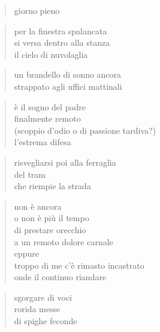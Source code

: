 \clearpage


\begin{verse}
    giorno pieno
\end{verse}

\begin{verse}
    per la finestra spalancata\\
    si versa dentro alla stanza\\
    il cielo di nuvolaglia
\end{verse}

\begin{verse}
    un brandello di sonno ancora\\
    strappato agli uffici mattinali
\end{verse}

\begin{verse}
    è il sogno del padre\\
    finalmente remoto\\
    (scoppio d’odio o di passione tardiva?)\\
    l’estrema difesa
\end{verse}

\begin{verse}
    risvegliarsi poi alla ferraglia\\
    del tram\\
    che riempie la strada
\end{verse}

\clearpage


\begin{verse}
    non è ancora\\
    o non è più il tempo\\
    di prestare orecchio\\
    a un remoto dolore carnale\\
    eppure\\
    troppo di me c'è rimasto incastrato\\
    onde il continuo riandare
\end{verse}

\clearpage


\begin{verse}
    sgorgare di voci\\
    rorida messe\\
    di spighe feconde
\end{verse}

